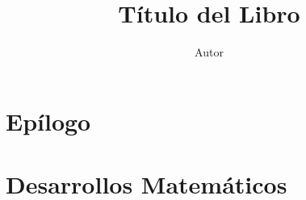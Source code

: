 \documentclass[11pt,a4paper,twoside,openright]{book}
\author{Autor}
\title{Título del Libro}
\begin{document}
\frontmatter

\maketitle

\tableofcontents{}

\chapter{Epílogo}


\mainmatter






\appendix
\chapter{Desarrollos Matemáticos}

\backmatter


\end{document}
